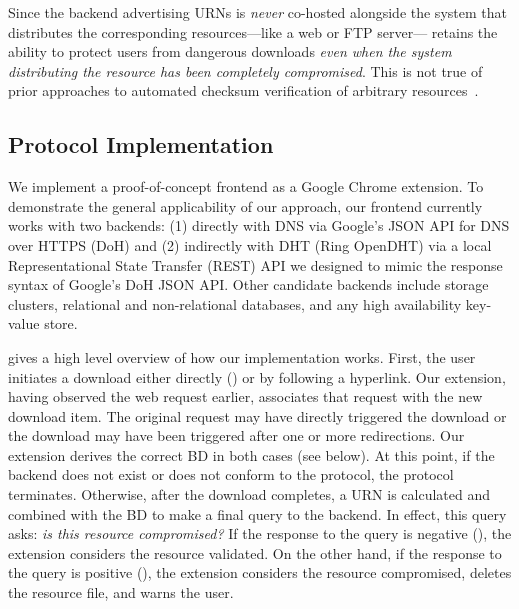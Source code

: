 Since the backend advertising URNs is \emph{never} co-hosted alongside the
system that distributes the corresponding resources---like a web or FTP
server---\SYSTEM{} retains the ability to protect users from dangerous downloads
\emph{even when the system distributing the resource has been completely
compromised}. This is not true of prior approaches to automated checksum
verification of arbitrary resources~\cite{Cherubini}.

\subsection{Protocol Implementation}


We implement a proof-of-concept \SYSTEM{} frontend as a Google Chrome extension.
To demonstrate the general applicability of our approach, our frontend currently
works with two backends: (1) directly with DNS via Google's JSON API for DNS
over HTTPS (DoH) and (2) indirectly with DHT (Ring OpenDHT) via a local
Representational State Transfer (REST) API we designed to mimic the response
syntax of Google's DoH JSON API. Other candidate backends include storage
clusters, relational and non-relational databases, and any high availability
key-value store.

 gives a high level overview of how our implementation
works. First, the user initiates a download either directly () or by following a hyperlink. Our extension, having observed the web
request earlier, associates that request with the new download item. The
original request may have directly triggered the download or the download may
have been triggered after one or more redirections. Our extension derives the
correct BD in both cases (see below). At this point, if the backend does not
exist or does not conform to the protocol, the protocol terminates. Otherwise,
after the download completes, a URN is calculated and combined with the BD to
make a final query to the backend. In effect, this query asks: \emph{is this
resource compromised?} If the response to the query is negative (), the extension considers the resource
validated. On the other hand, if the response to the query is positive (), the extension considers the resource
compromised, deletes the resource file, and warns the user.

